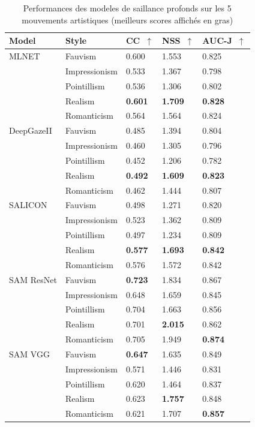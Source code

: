 \begin{table}[ht]
    \centering
        \begin{tabular}{|l|l|l|l|l|}
                \hline
        Model & Style & CC~$\uparrow$ & NSS~$\uparrow$  & AUC-J~$\uparrow$\\
                \hline
        MLNET       & Fauvism & 0.600 & 1.553 & 0.825\\
                    & Impressionism & 0.533 & 1.367 & 0.798\\
                    & Pointillism & 0.536 & 1.306 & 0.802\\
                    & Realism & \textbf{0.601} & \textbf{1.709} & \textbf{0.828}\\
                    & Romanticism & 0.564 & 1.564 & 0.824\\
                \hline
        DeepGazeII  & Fauvism & 0.485 & 1.394 & 0.804\\
                    & Impressionism & 0.460 & 1.305 & 0.796\\
                    & Pointillism & 0.452 & 1.206 & 0.782\\
                    & Realism & \textbf{0.492} & \textbf{1.609} & \textbf{0.823}\\
                    & Romanticism & 0.462 & 1.444 & 0.807\\
                \hline
        SALICON     & Fauvism & 0.498 & 1.271 & 0.820\\
                    & Impressionism & 0.523 & 1.362 & 0.809\\
                    & Pointillism & 0.497 & 1.234 & 0.809\\
                    & Realism & \textbf{0.577} & \textbf{1.693} & \textbf{0.842}\\
                    & Romanticism & 0.576 & 1.572 & 0.842\\
                \hline
        SAM ResNet  & Fauvism & \textbf{0.723} & 1.834 & 0.867\\
                    & Impressionism & 0.648 & 1.659 & 0.845\\
                    & Pointillism & 0.704 & 1.663 & 0.856\\
                    & Realism & 0.701 & \textbf{2.015} & 0.862\\
                    & Romanticism & 0.705 & 1.949 & \textbf{0.874}\\
                \hline
        SAM VGG     & Fauvism & \textbf{0.647} & 1.635 & 0.849\\
                    & Impressionism & 0.571 & 1.446 & 0.831\\
                    & Pointillism & 0.620 & 1.464 & 0.837\\
                    & Realism & 0.623 & \textbf{1.757} & 0.848\\
                    & Romanticism & 0.621 & 1.707 & \textbf{0.857}\\
        \hline
        \end{tabular}
    \caption{Performances des modeles de saillance profonds sur les 5 mouvements artistiques (meilleurs scores affichés en gras)}
    \label{tab:scoresmouvement}
\end{table}

